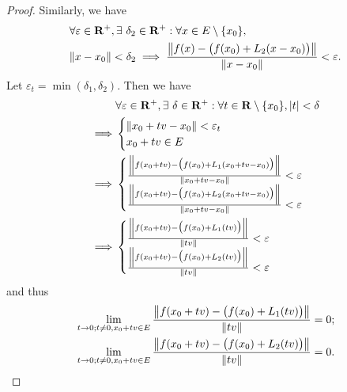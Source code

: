 \begin{proof}
    Similarly, we have
    \begin{align*}
         & \forall \varepsilon \in \mathbf{R}^+, \exists\ \delta_2 \in \mathbf{R}^+ : \forall x \in E \setminus \{x_0\},             \\
         & \norm*{x - x_0} < \delta_2 \implies \frac{\norm*{f(x) - \big(f(x_0) + L_2(x - x_0)\big)}}{\norm*{x - x_0}} < \varepsilon.
    \end{align*}
    Let \(\varepsilon_t = \min(\delta_1, \delta_2)\).
    Then we have
    \begin{align*}
                 & \forall \varepsilon \in \mathbf{R}^+, \exists\ \delta \in \mathbf{R}^+ : \forall t \in \mathbf{R} \setminus \{x_0\}, \abs*{t} < \delta \\
        \implies & \begin{cases}
                       \norm*{x_0 + tv - x_0} < \varepsilon_t \\
                       x_0 + tv \in E
                   \end{cases}                                                                                                 \\
        \implies & \begin{cases}
                       \frac{\norm*{f(x_0 + tv) - \big(f(x_0) + L_1(x_0 + tv - x_0)\big)}}{\norm*{x_0 + tv - x_0}} < \varepsilon \\
                       \frac{\norm*{f(x_0 + tv) - \big(f(x_0) + L_2(x_0 + tv - x_0)\big)}}{\norm*{x_0 + tv - x_0}} < \varepsilon
                   \end{cases}                                                                   \\
        \implies & \begin{cases}
                       \frac{\norm*{f(x_0 + tv) - \big(f(x_0) + L_1(tv)\big)}}{\norm*{tv}} < \varepsilon \\
                       \frac{\norm*{f(x_0 + tv) - \big(f(x_0) + L_2(tv)\big)}}{\norm*{tv}} < \varepsilon
                   \end{cases}
    \end{align*}
    and thus
    \begin{align*}
         & \lim_{t \to 0 ; t \neq 0, x_0 + tv \in E} \frac{\norm*{f(x_0 + tv) - \big(f(x_0) + L_1(tv)\big)}}{\norm*{tv}} = 0; \\
         & \lim_{t \to 0 ; t \neq 0, x_0 + tv \in E} \frac{\norm*{f(x_0 + tv) - \big(f(x_0) + L_2(tv)\big)}}{\norm*{tv}} = 0.
    \end{align*}

\end{proof}
